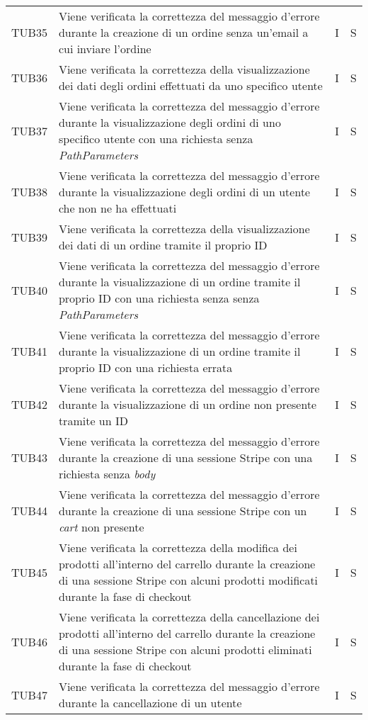 {\begin{longtable}{C{2cm} C{9.6cm} C{1.5cm} C{1cm}}
TUB35 & Viene verificata la correttezza del messaggio d'errore durante la creazione di un ordine senza un'email a cui inviare l'ordine & I & S\\

TUB36 & Viene verificata la correttezza della visualizzazione dei dati degli ordini effettuati da uno specifico utente & I & S\\

TUB37 & Viene verificata la correttezza del messaggio d'errore durante la visualizzazione degli ordini di uno specifico utente con una richiesta senza \textit{PathParameters} & I & S\\

TUB38 & Viene verificata la correttezza del messaggio d'errore durante la visualizzazione degli ordini di un utente che non ne ha effettuati & I & S\\

TUB39 & Viene verificata la correttezza della visualizzazione dei dati di un ordine tramite il proprio ID & I & S\\

TUB40 & Viene verificata la correttezza del messaggio d'errore durante la visualizzazione di un ordine tramite il proprio ID con una richiesta senza senza \textit{PathParameters} & I & S\\

TUB41 & Viene verificata la correttezza del messaggio d'errore durante la visualizzazione di un ordine tramite il proprio ID con una richiesta errata & I & S\\

TUB42 & Viene verificata la correttezza del messaggio d'errore durante la visualizzazione di un ordine non presente tramite un ID & I & S\\

TUB43 & Viene verificata la correttezza del messaggio d'errore durante la creazione di una sessione Stripe con una richiesta senza \textit{body} & I & S\\

TUB44 & Viene verificata la correttezza del messaggio d'errore durante la creazione di una sessione Stripe con un \textit{cart} non presente & I & S\\


TUB45 & Viene verificata la correttezza della modifica dei prodotti all'interno del carrello durante la creazione di una sessione Stripe con alcuni prodotti modificati durante la fase di checkout & I & S\\

TUB46 & Viene verificata la correttezza della cancellazione dei prodotti all'interno del carrello durante la creazione di una sessione Stripe con alcuni prodotti eliminati durante la fase di checkout & I & S\\

TUB47 & Viene verificata la correttezza del messaggio d'errore durante la cancellazione di un utente & I & S\\


\end{longtable}

}

